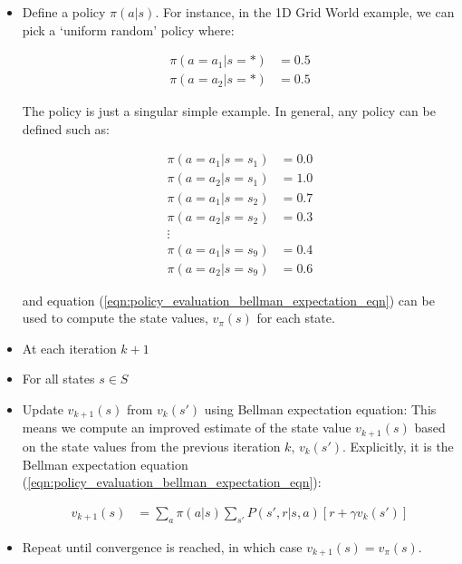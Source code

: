 \documentclass[a4paper,11pt]{article}
\begin{document}
\begin{itemize}
\item Define a policy $\pi(a|s)$.  For instance, in the 1D Grid World example, we can pick a `uniform random' policy where:

\begin{equation} \label{eqn:uniform_random_policy_for_1d_grid_world}
    \begin{split}
        \pi(a=a_1|s=\ast) &= 0.5 \\
        \pi(a=a_2|s=\ast) &= 0.5
    \end{split}
\end{equation}

The policy is just a singular simple example.  In general, any policy can be defined such as:

\begin{equation} \label{eqn:specific_weird_policy_for_1d_grid_world}
    \begin{split}
        \pi(a=a_1|s=s_1) &= 0.0 \\
        \pi(a=a_2|s=s_1) &= 1.0 \\
        \pi(a=a_1|s=s_2) &= 0.7 \\
        \pi(a=a_2|s=s_2) &= 0.3 \\
        \vdots \\
        \pi(a=a_1|s=s_{9}) &= 0.4 \\
        \pi(a=a_2|s=s_{9}) &= 0.6
    \end{split}
\end{equation}

and equation (\ref{eqn:policy_evaluation_bellman_expectation_eqn}) can be used to compute the state values, $v_\pi(s)$ for each state.

\item At each iteration $k+1$
\item For all states $s \in S$
\item Update $v_{k+1}(s)$ from $v_{k}(s')$ using Bellman expectation equation: This means we compute an improved estimate of the state value $v_{k+1}(s)$ based on the state values from the previous iteration $k$, $v_{k}(s')$.  Explicitly, it is the Bellman expectation equation (\ref{eqn:policy_evaluation_bellman_expectation_eqn}):

\begin{equation} \label{eqn:policy_evaluation_iteration_eqn}
\begin{split}
    v_{k+1} (s) &= \sum_{a} \pi(a|s) \sum_{s'} P(s',r|s,a) [r + \gamma v_{k}(s')]
\end{split}
\end{equation}

\item Repeat until convergence is reached, in which case $v_{k+1}(s) = v_\pi(s)$.
\end{itemize}
\end{document}
